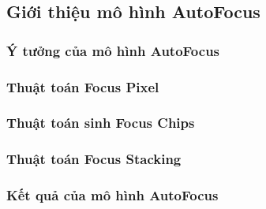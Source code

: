 {    \subsection{Giới thiệu mô hình AutoFocus}
    \subsubsection{Ý tưởng của mô hình AutoFocus}
    \subsubsection{Thuật toán Focus Pixel}
    \subsubsection{Thuật toán sinh Focus Chips}
    \subsubsection{Thuật toán Focus Stacking}
    \subsubsection{Kết quả của mô hình AutoFocus}
}